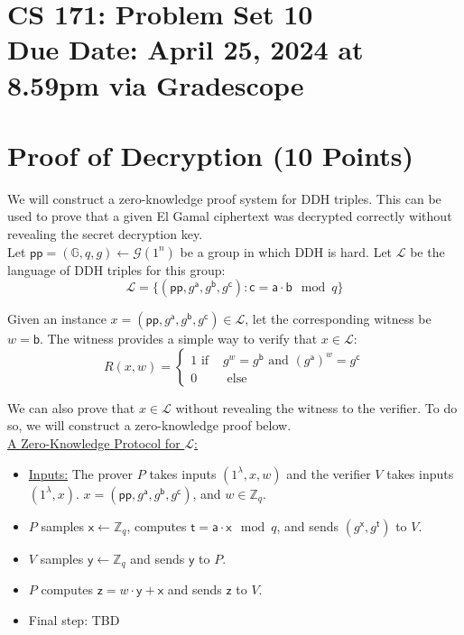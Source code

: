 \documentclass[11pt]{article}
\newcommand{\cL}{\mathcal{L}}
\newcommand{\GG}{\mathbb{G}}
\newcommand{\pp}{\mathsf{pp}}
\newcommand{\ZZ}{\mathbb{Z}}
\newcommand{\sfa}{\mathsf{a}}
\newcommand{\sfb}{\mathsf{b}}
\newcommand{\sfc}{\mathsf{c}}
\newcommand{\sft}{\mathsf{t}}
\newcommand{\sfx}{\mathsf{x}}
\newcommand{\sfy}{\mathsf{y}}
\newcommand{\sfz}{\mathsf{z}}
\newcommand{\secp}{\lambda}
\newcommand{\duedate}{April 25, 2024 at 8.59pm via Gradescope}
\numberwithin{equation}{section}
\begin{document}
\section*{CS 171: Problem Set 10\\ {\small Due Date: \duedate} }

\section{Proof of Decryption (10 Points)}
We will construct a zero-knowledge proof system for DDH triples. This can be used to prove that a given El Gamal ciphertext was decrypted correctly without revealing the secret decryption key.\\

Let $\pp = (\GG, q, g) \leftarrow \mathcal{G}(1^n)$ be a group in which DDH is hard. Let $\cL$ be the language of DDH triples for this group:
\[\cL = \{(\pp, g^\sfa, g^\sfb, g^\sfc) : \sfc = \sfa \cdot \sfb \mod q\}\]

Given an instance $x = (\pp, g^\sfa, g^\sfb, g^\sfc) \in \cL$, let the corresponding witness be $w = \sfb$. The witness provides a simple way to verify that $x \in \cL$:
\[R(x, w) = 
\begin{cases}
    1 \text{ if } & g^{w} = g^\sfb \text{ and } (g^\sfa)^w = g^{\sfc}\\
    0 & \text{ else }
\end{cases}\]

We can also prove that $x \in \cL$ without revealing the witness to the verifier. To do so, we will construct a zero-knowledge proof below.\\

\noindent\underline{A Zero-Knowledge Protocol for $\cL$:}
\begin{itemize}
    \item \underline{Inputs:} The prover $P$ takes inputs $(1^\secp, x, w)$ and the verifier $V$ takes inputs $(1^\secp, x)$. $x = (\pp, g^\sfa, g^\sfb, g^\sfc)$, and $w \in \ZZ_q$.
    \item $P$ samples $\sfx \leftarrow \ZZ_q$, computes $\sft = \sfa \cdot \sfx \mod q$, and sends $(g^\sfx,g^{\sft})$ to $V$. 
    \item $V$ samples $\sfy \leftarrow \mathbb{Z}_q$ and sends $\sfy$ to $P$.
    \item $P$ computes $\sfz = w \cdot \sfy + \sfx$ and sends $\sfz$ to $V$.
    \item Final step: TBD
\end{itemize}
\end{document}
